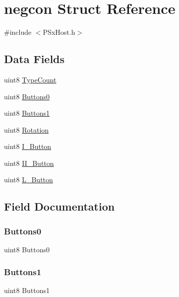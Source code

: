 \hypertarget{structnegcon}{}\section{negcon Struct Reference}
\label{structnegcon}


{\ttfamily \#include $<$P\+Sx\+Host.\+h$>$}

\subsection*{Data Fields}
\begin{DoxyCompactItemize}
\item 
uint8 \mbox{\hyperlink{structnegcon_af8950e4872b4b4b5dd2b837ac45a0603}{Type\+Count}}
\item 
uint8 \mbox{\hyperlink{structnegcon_a0d9f38dcaa6d84c7fc78d434b839f259}{Buttons0}}
\item 
uint8 \mbox{\hyperlink{structnegcon_a17ebb8fd1844de7d6545c9f96194d300}{Buttons1}}
\item 
uint8 \mbox{\hyperlink{structnegcon_a2a1584fdf4250f786d022e186f2142ba}{Rotation}}
\item 
uint8 \mbox{\hyperlink{structnegcon_af3e69808ca369874ae81bd04ccd6f0a8}{I\+\_\+\+Button}}
\item 
uint8 \mbox{\hyperlink{structnegcon_a859bfab55f91c5c5187f87fb358bb2c1}{I\+I\+\_\+\+Button}}
\item 
uint8 \mbox{\hyperlink{structnegcon_adb68f2209f6c13e3befce696491a48e4}{L\+\_\+\+Button}}
\end{DoxyCompactItemize}


\subsection{Field Documentation}
\mbox{\label{structnegcon_a0d9f38dcaa6d84c7fc78d434b839f259}} 
\subsubsection{\texorpdfstring{Buttons0}{Buttons0}}
{\footnotesize\ttfamily uint8 Buttons0}

\mbox{\label{structnegcon_a17ebb8fd1844de7d6545c9f96194d300}} 
\subsubsection{\texorpdfstring{Buttons1}{Buttons1}}
{\footnotesize\ttfamily uint8 Buttons1}

